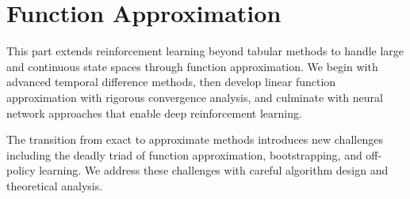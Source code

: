 \part{Function Approximation}

This part extends reinforcement learning beyond tabular methods to handle large and continuous state spaces through function approximation. We begin with advanced temporal difference methods, then develop linear function approximation with rigorous convergence analysis, and culminate with neural network approaches that enable deep reinforcement learning.

The transition from exact to approximate methods introduces new challenges including the deadly triad of function approximation, bootstrapping, and off-policy learning. We address these challenges with careful algorithm design and theoretical analysis.



